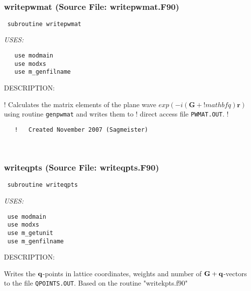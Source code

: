 \documentclass[11pt]{article}
\begin{document}

 
 
\mbox{}\hrulefill\ 
 
\subsubsection{writepwmat (Source File: writepwmat.F90)}


\begin{verbatim} subroutine writepwmat\end{verbatim}{\em USES:}
\begin{verbatim}   use modmain
   use modxs
   use m_genfilname\end{verbatim}
{\sf DESCRIPTION:\\ }


   !   Calculates the matrix elements of the plane wave $exp(-i(\mathbf{G}+
   !   mathbf{q})\mathbf{r})$ using routine {\tt genpwmat} and writes them to
   !   direct access file {\tt PWMAT.OUT}.
   !
\begin{verbatim}   !   Created November 2007 (Sagmeister)\end{verbatim}


 
 
\mbox{}\hrulefill\ 
 
\subsubsection{writeqpts (Source File: writeqpts.F90)}


\begin{verbatim} subroutine writeqpts\end{verbatim}{\em USES:}
\begin{verbatim} use modmain
 use modxs
 use m_getunit
 use m_genfilname\end{verbatim}
{\sf DESCRIPTION:\\ }


     Writes the ${\bf q}$-points in lattice coordinates, weights and number of
     ${\bf G+q}$-vectors to the file {\tt QPOINTS.OUT}. Based on the routine 
     "writekpts.f90"
  
\end{document}
